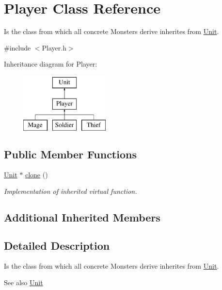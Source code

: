 \hypertarget{class_player}{}\section{Player Class Reference}
\label{class_player}


Is the class from which all concrete Monsters derive inherites from \hyperlink{class_unit}{Unit}.  




{\ttfamily \#include $<$Player.\+h$>$}

Inheritance diagram for Player\+:\begin{figure}[H]
\begin{center}
\leavevmode
\includegraphics[height=3.000000cm]{class_player}
\end{center}
\end{figure}
\subsection*{Public Member Functions}
\begin{DoxyCompactItemize}
\item 
\hyperlink{class_unit}{Unit} $\ast$ \hyperlink{class_player_ad690ac4f9f851298abeb0955321ea29e}{clone} ()
\begin{DoxyCompactList}\small\item\em Implementation of inherited virtual function. \end{DoxyCompactList}\end{DoxyCompactItemize}
\subsection*{Additional Inherited Members}


\subsection{Detailed Description}
Is the class from which all concrete Monsters derive inherites from \hyperlink{class_unit}{Unit}. 

\begin{DoxySeeAlso}{See also}
\hyperlink{class_unit}{Unit} 
\end{DoxySeeAlso}


